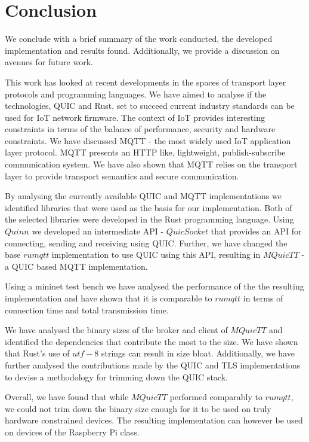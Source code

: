 \chapter{Conclusion} \label{chap:conclusion}

We conclude with a brief summary of the work conducted, the developed implementation and results found.
Additionally, we provide a discussion on avenues for future work.

This work has looked at recent developments in the spaces of transport layer protocols and programming languages.
We have aimed to analyse if the technologies, QUIC and Rust, set to succeed current industry standards can be used for IoT network firmware.
The context of IoT provides interesting constraints in terms of the balance of performance, security and hardware constraints.
We have discussed MQTT - the most widely used IoT application layer protocol.
MQTT presents an HTTP like, lightweight, publish-subscribe communication system.
We have also shown that MQTT relies on the transport layer to provide transport semantics and secure communication.

By analysing the currently available QUIC and MQTT implementations we identified libraries that were used as the basis for our implementation.
Both of the selected libraries were developed in the Rust programming language.
Using $Quinn$ we developed an intermediate API - $QuicSocket$ that provides an API for connecting, sending and receiving using QUIC.
Further, we have changed the base $rumqtt$ implementation to use QUIC using this API, resulting in $MQuicTT$ - a QUIC based MQTT implementation.

Using a mininet test bench we have analysed the performance of the the resulting implementation and have shown that it is comparable to $rumqtt$ in terms of connection time and total transmission time.

We have analysed the binary sizes of the broker and client of $MQuicTT$ and identified the dependencies that contribute the most to the size.
We have shown that Rust's use of $utf-8$ strings can result in size bloat.
Additionally, we have further analysed the contributions made by the QUIC and TLS implementations to devise a methodology for trimming down the QUIC stack.

Overall, we have found that while $MQuicTT$ performed comparably to $rumqtt$, we could not trim down the binary size enough for it to be used on truly hardware constrained devices.
The resulting implementation can however be used on devices of the Raspberry Pi class.

